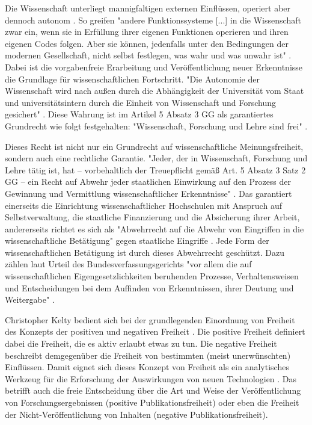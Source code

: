 Die Wissenschaft unterliegt mannigfaltigen externen Einflüssen, operiert aber dennoch autonom \cite{Luhmann_1998}. So greifen "andere Funktionssysteme [...] in die Wissenschaft zwar ein, wenn sie in Erfüllung ihrer eigenen Funktionen operieren und ihren eigenen Codes folgen. Aber sie können, jedenfalls unter den Bedingungen der modernen Gesellschaft, nicht selbst festlegen, was wahr und was unwahr ist" \cite[:293]{Luhmann_1998}. Dabei ist die vorgabenfreie Erarbeitung und Veröffentlichung neuer Erkenntnisse die Grundlage für wissenschaftlichen Fortschritt. "Die Autonomie der Wissenschaft wird nach außen durch die Abhängigkeit der Universität vom Staat und universitätsintern durch die Einheit von Wissenschaft und Forschung gesichert" \cite{Huber_2005}. Diese Wahrung ist im Artikel 5 Absatz 3 GG als garantiertes Grundrecht wie folgt festgehalten: "Wissenschaft, Forschung und Lehre sind frei" \cite{Grundgesetz_2015}.

Dieses Recht ist nicht nur ein Grundrecht auf wissenschaftliche Meinungsfreiheit, sondern auch eine rechtliche Garantie. "Jeder, der in Wissenschaft, Forschung und Lehre tätig ist, hat – vorbehaltlich der Treuepflicht gemäß Art. 5 Absatz 3 Satz 2 GG – ein Recht auf Abwehr jeder staatlichen Einwirkung auf den Prozess der Gewinnung und Vermittlung wissenschaftlicher Erkenntnisse" \cite{BVerfGE_1973}. Das garantiert einerseits die Einrichtung wissenschaftlicher Hochschulen mit Anspruch auf Selbstverwaltung, die staatliche Finanzierung und die Absicherung ihrer Arbeit, andererseits richtet es sich als "Abwehrrecht auf die Abwehr von Eingriffen in die wissenschaftliche Betätigung" gegen staatliche Eingriffe \cite{Mayen_1992} \cite{Spindler_2006}. Jede Form der wissenschaftlichen Betätigung ist durch dieses Abwehrrecht geschützt. Dazu zählen laut Urteil des Bundesverfassungsgerichts "vor allem die auf wissenschaftlichen Eigengesetzlichkeiten beruhenden Prozesse, Verhaltensweisen und Entscheidungen bei dem Auffinden von Erkenntnissen, ihrer Deutung und Weitergabe" \cite{BVerfGE_1973}.

Christopher Kelty bedient sich bei der grundlegenden Einordnung von Freiheit des Konzepts der positiven und negativen Freiheit \cite{Kelty_2014}. Die positive Freiheit definiert dabei die Freiheit, die es aktiv erlaubt etwas zu tun. Die negative Freiheit beschreibt demgegenüber die Freiheit von bestimmten (meist unerwünschten) Einflüssen. Damit eignet sich dieses Konzept von Freiheit als ein analytisches Werkzeug für die Erforschung der Auswirkungen von neuen Technologien \cite{Kelty_2014}. Das betrifft auch die freie Entscheidung über die Art und Weise der Veröffentlichung von Forschungsergebnissen (positive Publikationsfreiheit) \cite{Fangerau_2014} \cite[:190]{Fehling_2014} oder eben die Freiheit der Nicht-Veröffentlichung von Inhalten (negative Publikationsfreiheit).


